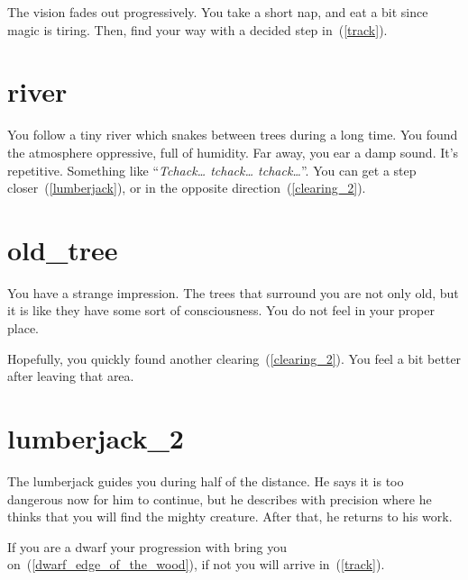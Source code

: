 The vision fades out progressively. You take a short nap, and eat a bit
since magic is tiring. Then, find your way with a decided step in~(\ref{track}).

\section{river}

You follow a tiny river which snakes between trees during a long time. You found
the atmosphere oppressive, full of humidity. Far away, you ear a damp sound.
It's repetitive. Something like ``\textit{Tchack… tchack… tchack…}''. You can
get a step closer~(\ref{lumberjack}), or in the opposite
direction~(\ref{clearing_2}).

\section{old_tree}

You have a strange impression. The trees that surround you are not only old, but
it is like they have some sort of consciousness. You do not feel in your proper
place.

Hopefully, you quickly found another clearing~(\ref{clearing_2}). You feel a bit
better after leaving that area.

\section{lumberjack_2}

The lumberjack guides you during half of the distance. He says it is too dangerous
now for him to continue, but he describes with precision where he thinks that you
will find the mighty creature. After that, he returns to his work.

If you are a dwarf your progression with bring you
on~(\ref{dwarf_edge_of_the_wood}), if not you will arrive in~(\ref{track}).
